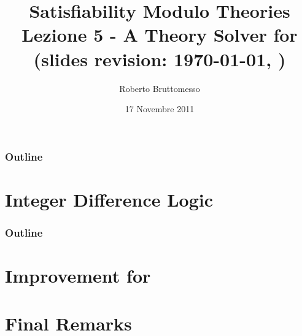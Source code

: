 \documentclass[xcolor=dvipsnames
              ]{beamer}
\title[\tsolver for \Idl]{Satisfiability Modulo Theories\\ Lezione 5 - A Theory Solver for \Idl \\ {\tiny (slides revision: \today, \currenttime)}}
\author[R. Bruttomesso]{\large Roberto Bruttomesso}
\date{17 Novembre 2011}
\institute[SMT]{\large Seminario di Logica Matematica \\(Corso Prof. Silvio Ghilardi)}
\begin{document}
\frame{\titlepage}



\begin{frame}
  \frametitle{Outline}
  \tableofcontents
\end{frame}

\section{Integer Difference Logic}




\begin{frame}
  \frametitle{Outline}
  \tableofcontents
\end{frame}

\section{Improvement for \tsolver}


\section{Final Remarks}

\end{document}

